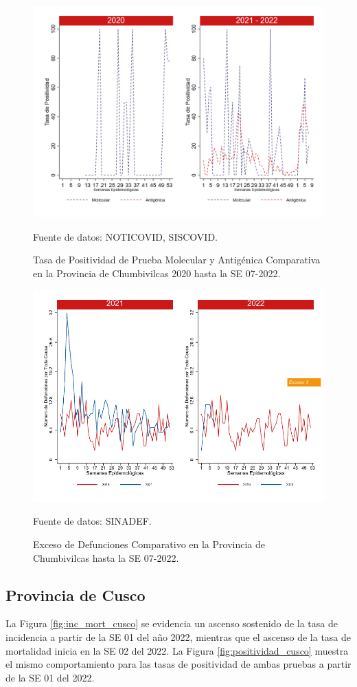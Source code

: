 \documentclass[12pt,a4paper,openany]{book}
\begin{document}
		\begin{figure}[h]
			\caption{Tasa de Positividad de Prueba Molecular y Antigénica Comparativa en la Provincia de Chumbivilcas 2020 hasta la SE 07-2022.}\label{fig:positividad_chumbivilcas}
			\begin{center}
				\includegraphics[width=0.7\linewidth]{../figuras/positividad_20_21_6.png}
			\end{center}
			{\footnotesize {Fuente de datos: NOTICOVID, SISCOVID.}}
		\end{figure}
		
		\begin{figure}[h]
			\caption{Exceso de Defunciones Comparativo en la Provincia de Chumbivilcas hasta la SE 07-2022.}\label{fig:exceso_chumbivilcas}
			\begin{center}
				\includegraphics[width=0.7\linewidth]{../figuras/exceso_6.pdf}
			\end{center}
			{\footnotesize {Fuente de datos: SINADEF.}}
		\end{figure}
		
		\clearpage
		
		\subsection*{Provincia de Cusco}
		\noindent La Figura \ref{fig:inc_mort_cusco} se evidencia un ascenso sostenido de la tasa de incidencia a partir de la SE 01 del año 2022, mientras que el ascenso de la tasa de mortalidad inicia en la SE 02 del 2022.   
		\noindent La  Figura \ref{fig:positividad_cusco} muestra el mismo comportamiento para las tasas de positividad de ambas pruebas a partir de la SE 01 del 2022. 
	
\end{document}
